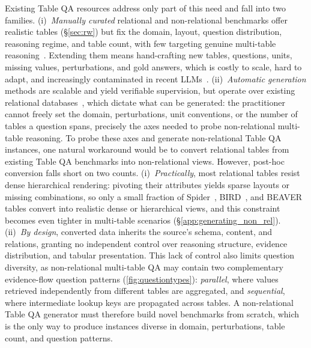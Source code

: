 Existing Table QA resources address only part of this need and fall into two families. (i)~\emph{Manually curated} relational and non-relational benchmarks offer realistic tables (\S\ref{sec:rw}) but fix the domain, layout, question distribution, reasoning regime, and table count, with few targeting genuine multi-table reasoning~\cite{1.26,1.16}. Extending them means hand-crafting new tables, questions, units, missing values, perturbations, and gold answers, which is costly to scale, hard to adapt, and increasingly contaminated in recent LLMs~\cite{datacontamination}. (ii)~\emph{Automatic generation} methods are scalable and yield verifiable supervision, but operate over existing relational databases~\cite{PapicchioPC23,5.5,5.8}, which dictate what can be generated: the practitioner cannot freely set the domain, perturbations, unit conventions, or the number of tables a question spans, precisely the axes needed to probe non-relational multi-table reasoning.
To probe these axes and generate non-relational Table QA instances, one natural workaround would be to convert relational tables from existing Table QA benchmarks into non-relational views. However, post-hoc conversion falls short on two counts. (i)~\emph{Practically}, most relational tables resist dense hierarchical rendering: pivoting their attributes yields sparse layouts or missing combinations, so only a small fraction of Spider~\cite{1.6}, BIRD~\cite{1.20}, and BEAVER~\cite{1.30} tables convert into realistic dense or hierarchical views, and this constraint becomes even tighter in multi-table scenarios (\S\ref{app:generating_non_rel}). (ii)~\emph{By design}, converted data inherits the source's schema, content, and relations, granting no independent control over reasoning structure, evidence distribution, and tabular presentation. This lack of control also limits question diversity, as non-relational multi-table QA may contain two complementary evidence-flow question patterns (\autoref{fig:questiontypes}): \emph{parallel}, where values retrieved independently from different tables are aggregated, and \emph{sequential}, where intermediate lookup keys are propagated across tables. 
A non-relational Table QA generator must therefore build novel benchmarks from scratch, which is the only way to produce instances diverse in domain, perturbations, table count, and question patterns. 
